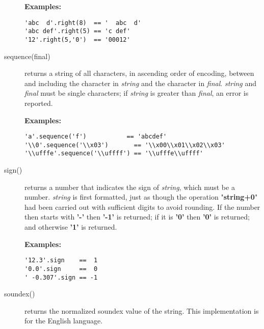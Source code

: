 \begin{description}
\textbf{Examples:}
\begin{lstlisting}
'abc  d'.right(8)  == '  abc  d'
'abc def'.right(5) == 'c def'
'12'.right(5,'0')  == '00012'
\end{lstlisting}

\item[sequence(final)]\label{refsequen}
 returns a string of all characters, in ascending order of encoding,
between and including the character in \emph{string} and the
character in \emph{final}.
\emph{string} and \emph{final} must be single characters;
if \emph{string} is greater than \emph{final}, an error is
reported.
 
\textbf{Examples:}
\begin{lstlisting}
'a'.sequence('f')           == 'abcdef'
'\\0'.sequence('\\x03')       == '\\x00\\x01\\x02\\x03'
'\\ufffe'.sequence('\\uffff') == '\\ufffe\\uffff'
\end{lstlisting}

\item[sign()]\label{refsign}
returns a number that indicates the sign of \emph{string}, which
must be a number.
\emph{string} is first formatted, just as though the operation
"\textbf{string+0}" had been carried out with sufficient digits
to avoid rounding.
If the number then starts with \textbf{'-'} then \textbf{'-1'} is
returned; if it is \textbf{'0'} then \textbf{'0'} is returned; and
otherwise \textbf{'1'} is returned.
 
\textbf{Examples:}
\begin{lstlisting}
'12.3'.sign    ==  1
'0.0'.sign     ==  0
' -0.307'.sign == -1
\end{lstlisting}

\item[soundex()]\label{refsoundex}
 returns the normalized soundex value of the string. This implementation
is for the English language.  


\end{description}
